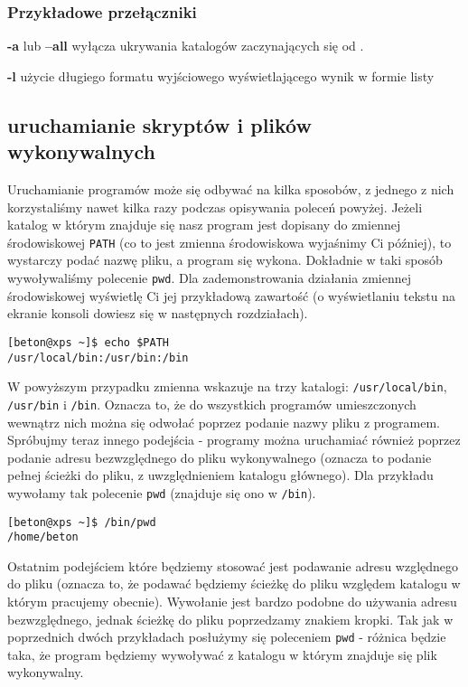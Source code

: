 \subsubsection*{Przykładowe przełączniki}
\begin{description}
\item \textbf{-a} lub \textbf{--all} wyłącza ukrywania katalogów zaczynających się od .
\item \textbf{-l} użycie długiego formatu wyjściowego wyświetlającego wynik w formie listy
\end{description}

\subsection{uruchamianie skryptów i plików wykonywalnych}
Uruchamianie programów może się odbywać na kilka sposobów, z jednego z nich korzystaliśmy nawet kilka razy podczas opisywania poleceń powyżej. Jeżeli katalog w którym znajduje się nasz program jest dopisany do zmiennej środowiskowej \texttt{PATH} (co to jest zmienna środowiskowa wyjaśnimy Ci później), to wystarczy podać nazwę pliku, a program się wykona. Dokładnie w taki sposób wywoływaliśmy polecenie \texttt{pwd}. Dla zademonstrowania działania zmiennej środowiskowej wyświetlę Ci jej przykładową zawartość (o wyświetlaniu tekstu na ekranie konsoli dowiesz się w następnych rozdziałach).
\begin{verbatim}
[beton@xps ~]$ echo $PATH
/usr/local/bin:/usr/bin:/bin
\end{verbatim}
W powyższym przypadku zmienna wskazuje na trzy katalogi: \texttt{/usr/local/bin}, \texttt{/usr/bin} i \texttt{/bin}. Oznacza to, że do wszystkich programów umieszczonych wewnątrz nich można się odwołać poprzez podanie nazwy pliku z programem.
\newline
Spróbujmy teraz innego podejścia - programy można uruchamiać również poprzez podanie adresu bezwzględnego do pliku wykonywalnego (oznacza to podanie pełnej ścieżki do pliku, z uwzględnieniem katalogu głównego). Dla przykładu wywołamy tak polecenie \texttt{pwd} (znajduje się ono w \texttt{/bin}).
\begin{verbatim}
[beton@xps ~]$ /bin/pwd
/home/beton
\end{verbatim}
Ostatnim podejściem które będziemy stosować jest podawanie adresu względnego do pliku (oznacza to, że podawać będziemy ścieżkę do pliku względem katalogu w którym pracujemy obecnie). Wywołanie jest bardzo podobne do używania adresu bezwzględnego, jednak ścieżkę do pliku poprzedzamy znakiem kropki. Tak jak w poprzednich dwóch przykładach posłużymy się poleceniem \texttt{pwd} - różnica będzie taka, że program będziemy wywoływać z katalogu w którym znajduje się plik wykonywalny.
